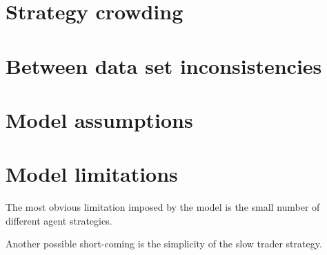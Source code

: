 \section{Strategy crowding}

\section{Between data set inconsistencies}

\section{Model assumptions}

\section{Model limitations}
The most obvious limitation imposed by the model is the small number of different agent strategies.

Another possible short-coming is the simplicity of the slow trader strategy. 